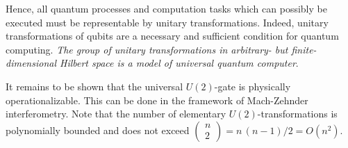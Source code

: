 \documentclass [11pt]{llncs}
\begin{document}
Hence, all quantum processes and computation tasks which can possibly be
executed must be representable by unitary transformations. Indeed,
unitary
transformations of qubits are a necessary and sufficient condition for
quantum computing. {\em The group of unitary transformations in
arbitrary- but finite-dimensional Hilbert space is a model of
universal quantum computer}.



It remains to be shown that the universal $U(2)$-gate is physically
operationalizable. This can be done
in the framework of Mach-Zehnder interferometry.
Note that the number of elementary $U(2)$-transformations is
polynomially bounded and does not exceed
$\left(
\begin{array}{c}
n\\2
\end{array}
\right) ={n\,(n-1)/ 2} =O(n^2)
$.
\end{document}
